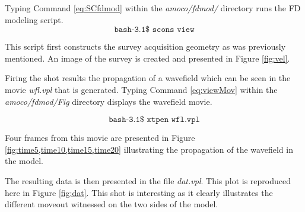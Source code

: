 {
\tiny

\normalsize
}

Typing Command \ref{eq:SCfdmod} within the \emph{amoco/fdmod/} directory runs the FD modeling script.
\begin{equation}\label{eq:SCfdmod} \texttt{bash-3.1\$\ scons\ view} \end{equation}

This script first constructs the survey acquisition geometry as was previously mentioned.  An image of the survey is created and presented
in Figure \ref{fig:vel}.


Firing the shot results the propagation of a wavefield which can be seen in the movie \emph{wfl.vpl} that is generated.  Typing 
Command \ref{eq:viewMov} within the \emph{amoco/fdmod/Fig} directory displays the wavefield movie.

\begin{equation}\label{eq:viewMov} \texttt{bash-3.1\$\ xtpen\ wfl.vpl} \end{equation}


Four frames from this movie are presented in Figure \ref{fig:time5,time10,time15,time20}  illustrating the 
propagation of the wavefield in the model.  



The resulting data is then presented in the file \emph{dat.vpl}.  This plot is reproduced here in Figure \ref{fig:dat}.  This shot is 
interesting as it clearly illustrates the different moveout witnessed on the two sides of the model.  

